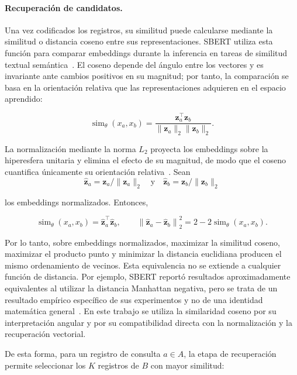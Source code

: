 

\paragraph{Recuperación de candidatos.}
Una vez codificados los registros, su similitud puede calcularse mediante la similitud o distancia coseno entre sus representaciones. SBERT utiliza esta función para comparar embeddings durante la inferencia en tareas de similitud textual semántica~\cite{reimers2019}. El coseno depende del ángulo entre los vectores y es invariante ante cambios positivos en su magnitud; por tanto, la comparación se basa en la orientación relativa que las representaciones adquieren en el espacio aprendido:

\[
\operatorname{sim}_\theta(x_a,x_b)=
\frac{\mathbf{z}_a^{\top}\mathbf{z}_b}
{\lVert\mathbf{z}_a\rVert_2\lVert\mathbf{z}_b\rVert_2}.
\]

La normalización mediante la norma $L_2$ proyecta los embeddings sobre la hiperesfera unitaria y elimina el efecto de su magnitud, de modo que el coseno cuantifica únicamente su orientación relativa~\cite{manning2008}.
Sean
\[
\widehat{\mathbf{z}}_a=\mathbf{z}_a/\lVert\mathbf{z}_a\rVert_2 \quad \text{y} \quad \widehat{\mathbf{z}}_b=\mathbf{z}_b/\lVert\mathbf{z}_b\rVert_2
\]

los embeddings normalizados. Entonces,

\[
\operatorname{sim}_\theta(x_a,x_b)
=\widehat{\mathbf{z}}_a^{\top}\widehat{\mathbf{z}}_b,
\qquad
\left\lVert\widehat{\mathbf{z}}_a-\widehat{\mathbf{z}}_b\right\rVert_2^2
=2-2\operatorname{sim}_\theta(x_a,x_b).
\]

Por lo tanto, sobre embeddings normalizados, maximizar la similitud coseno, maximizar el producto punto y minimizar la distancia euclidiana producen el mismo ordenamiento de vecinos. Esta equivalencia no se extiende a cualquier función de distancia. Por ejemplo, SBERT reportó resultados aproximadamente equivalentes al utilizar la distancia Manhattan negativa, pero se trata de un resultado empírico específico de sus experimentos y no de una identidad matemática general~\cite{reimers2019}. En este trabajo se utiliza la similaridad coseno por su interpretación angular y por su compatibilidad directa con la normalización y la recuperación vectorial.

De esta forma, para un registro de consulta $a\in A$, la etapa de recuperación permite seleccionar los $K$ registros de $B$ con mayor similitud:

